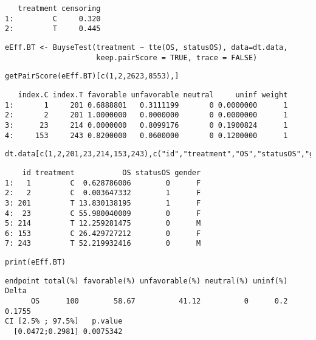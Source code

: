 \documentclass[12pt]{article}
\begin{document}
\begin{verbatim}
   treatment censoring
1:         C     0.320
2:         T     0.445
\end{verbatim}


\lstset{language=r,label= ,caption= ,captionpos=b,numbers=none}
\begin{lstlisting}
eEff.BT <- BuyseTest(treatment ~ tte(OS, statusOS), data=dt.data,
                     keep.pairScore = TRUE, trace = FALSE)
\end{lstlisting}

\lstset{language=r,label= ,caption= ,captionpos=b,numbers=none}
\begin{lstlisting}
getPairScore(eEff.BT)[c(1,2,2623,8553),]
\end{lstlisting}

\begin{verbatim}
   index.C index.T favorable unfavorable neutral     uninf weight
1:       1     201 0.6888801   0.3111199       0 0.0000000      1
2:       2     201 1.0000000   0.0000000       0 0.0000000      1
3:      23     214 0.0000000   0.8099176       0 0.1900824      1
4:     153     243 0.8200000   0.0600000       0 0.1200000      1
\end{verbatim}


\lstset{language=r,label= ,caption= ,captionpos=b,numbers=none}
\begin{lstlisting}
dt.data[c(1,2,201,23,214,153,243),c("id","treatment","OS","statusOS","gender")]
\end{lstlisting}

\begin{verbatim}
    id treatment           OS statusOS gender
1:   1         C  0.628786006        0      F
2:   2         C  0.003647332        1      F
3: 201         T 13.830138195        1      F
4:  23         C 55.980040009        0      F
5: 214         T 12.259281475        0      M
6: 153         C 26.429727212        0      F
7: 243         T 52.219932416        0      M
\end{verbatim}


\lstset{language=r,label= ,caption= ,captionpos=b,numbers=none}
\begin{lstlisting}
print(eEff.BT)
\end{lstlisting}

\begin{verbatim}
endpoint total(%) favorable(%) unfavorable(%) neutral(%) uninf(%)  Delta
      OS      100        58.67          41.12          0      0.2 0.1755
CI [2.5% ; 97.5%]   p.value
  [0.0472;0.2981] 0.0075342
\end{verbatim}
\end{document}

